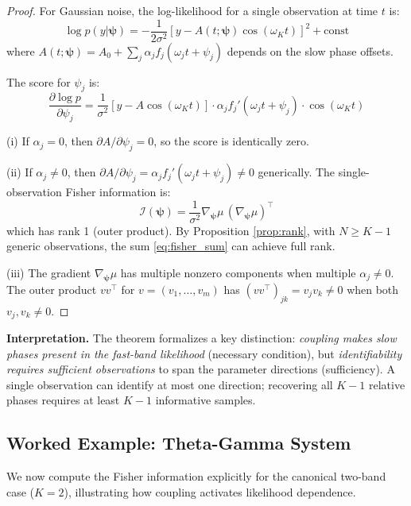 \documentclass[12pt]{article}
\newcommand{\FIM}{\mathcal{I}}
\begin{document}
\begin{proof}
For Gaussian noise, the log-likelihood for a single observation at time $t$ is:
\begin{equation}
\log p(y|\bm{\psi}) = -\frac{1}{2\sigma^2}[y - A(t;\bm{\psi})\cos(\omega_K t)]^2 + \text{const}
\end{equation}
where $A(t;\bm{\psi}) = A_0 + \sum_j \alpha_j f_j(\omega_j t + \psi_j)$ depends on the slow phase offsets.

The score for $\psi_j$ is:
\begin{equation}
\frac{\partial \log p}{\partial \psi_j} = \frac{1}{\sigma^2}[y - A\cos(\omega_K t)] \cdot \alpha_j f_j'(\omega_j t + \psi_j) \cdot \cos(\omega_K t)
\end{equation}

(i) If $\alpha_j = 0$, then $\partial A / \partial \psi_j = 0$, so the score is identically zero.

(ii) If $\alpha_j \neq 0$, then $\partial A / \partial \psi_j = \alpha_j f_j'(\omega_j t + \psi_j) \neq 0$ generically. The single-observation Fisher information is:
\begin{equation}
\FIM(\bm{\psi}) = \frac{1}{\sigma^2} \nabla_{\bm{\psi}}\mu \, (\nabla_{\bm{\psi}}\mu)^\top
\end{equation}
which has rank 1 (outer product). By Proposition \ref{prop:rank}, with $N \geq K-1$ generic observations, the sum \eqref{eq:fisher_sum} can achieve full rank.

(iii) The gradient $\nabla_{\bm{\psi}}\mu$ has multiple nonzero components when multiple $\alpha_j \neq 0$. The outer product $vv^\top$ for $v = (v_1, \ldots, v_m)$ has $(vv^\top)_{jk} = v_j v_k \neq 0$ when both $v_j, v_k \neq 0$.
\end{proof}

\textbf{Interpretation.} The theorem formalizes a key distinction: \emph{coupling makes slow phases present in the fast-band likelihood} (necessary condition), but \emph{identifiability requires sufficient observations} to span the parameter directions (sufficiency). A single observation can identify at most one direction; recovering all $K-1$ relative phases requires at least $K-1$ informative samples.

\subsection{Worked Example: Theta-Gamma System}

We now compute the Fisher information explicitly for the canonical two-band case ($K=2$), illustrating how coupling activates likelihood dependence.
\end{document}
